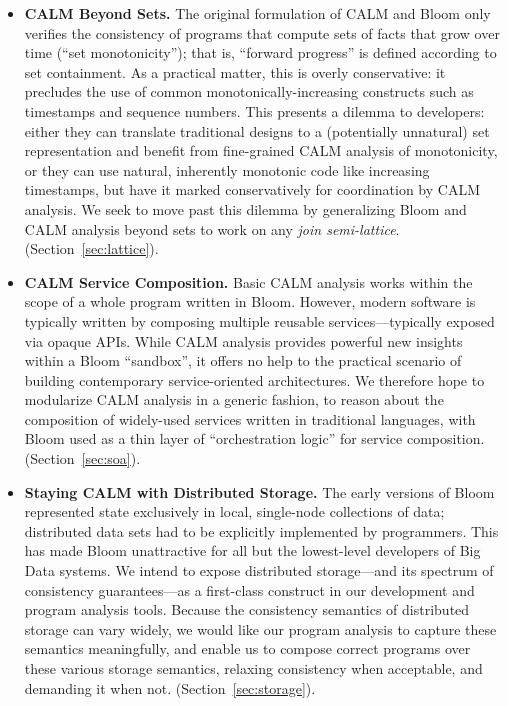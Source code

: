 \begin{itemize}
  \item \textbf{CALM Beyond Sets.}  The original formulation of CALM and Bloom only verifies the consistency of programs that compute sets of facts that grow over time (``set monotonicity''); that is, ``forward progress'' is defined according to set containment. As a practical matter, this is overly conservative: it precludes the use of common monotonically-increasing constructs such as timestamps and sequence numbers.  This presents a dilemma to developers: either they can translate traditional designs to a (potentially unnatural) set representation and benefit from fine-grained CALM analysis of monotonicity, or they can use natural, inherently monotonic code like increasing timestamps, but have it marked conservatively for coordination by CALM analysis.  We seek to move past this dilemma by generalizing Bloom and CALM analysis beyond sets to work on any \emph{join semi-lattice}.  (Section~\ref{sec:lattice}).

  \item \textbf{CALM Service Composition.}  Basic CALM analysis works within the scope of a whole program written in Bloom. However, modern software is typically written by composing multiple reusable services---typically exposed via opaque APIs. While CALM analysis provides powerful new insights within a Bloom ``sandbox'', it offers no help to the practical scenario of building contemporary service-oriented architectures.  We therefore hope to modularize CALM analysis in a generic fashion, to reason about the composition of widely-used services written in traditional languages, with Bloom used as a thin layer of ``orchestration logic'' for service composition.  (Section~\ref{sec:soa}).

  \item \textbf{Staying CALM with Distributed Storage.} The early versions of Bloom represented state exclusively in local, single-node collections of data; distributed data sets had to be explicitly implemented by programmers.  This has made Bloom unattractive for all but the lowest-level developers of Big Data systems.  We intend to expose distributed storage---and its spectrum of consistency guarantees---as a first-class construct in our development and program analysis tools.  Because the consistency semantics of distributed storage can vary widely, we would like our program analysis to capture these semantics meaningfully, and enable us to compose correct programs over these various storage semantics, relaxing consistency when acceptable, and demanding it when not.  (Section~\ref{sec:storage}).
  

\end{itemize}
